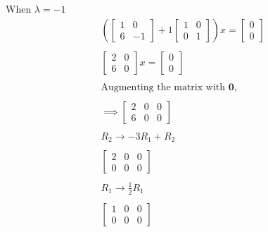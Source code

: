 \documentclass[12pt, a4paper]{article}
\begin{document}
\begin{center}
    When $\lambda = -1$ \\
    \begin{align*}
        \left(\begin{bmatrix}
            1 & 0 \\
            6 & -1
        \end{bmatrix} + 1 \begin{bmatrix}
            1 & 0 \\
            0 & 1
        \end{bmatrix}\right)x = \begin{bmatrix}
            0 \\
            0
        \end{bmatrix} \\ \\
        \begin{bmatrix}
            2 & 0 \\
            6 & 0
        \end{bmatrix}x = \begin{bmatrix}
            0 \\
            0
        \end{bmatrix} \\ \\
        \text{Augmenting the matrix with } \boldsymbol{0}, \\ \\
        \implies \begin{bmatrix}
            2 & 0 & 0 \\
            6 & 0 & 0
        \end{bmatrix} \\ \\
        R_2 \rightarrow -3R_1 + R_2 \\ \\
        \begin{bmatrix}
            2 & 0 & 0 \\
            0 & 0 & 0
        \end{bmatrix} \\ \\
        R_1 \rightarrow \frac{1}{2}R_1 \\ \\
        \begin{bmatrix}
            1 & 0 & 0 \\
            0 & 0 & 0
        \end{bmatrix}
    \end{align*}


\end{center}
\end{document}
